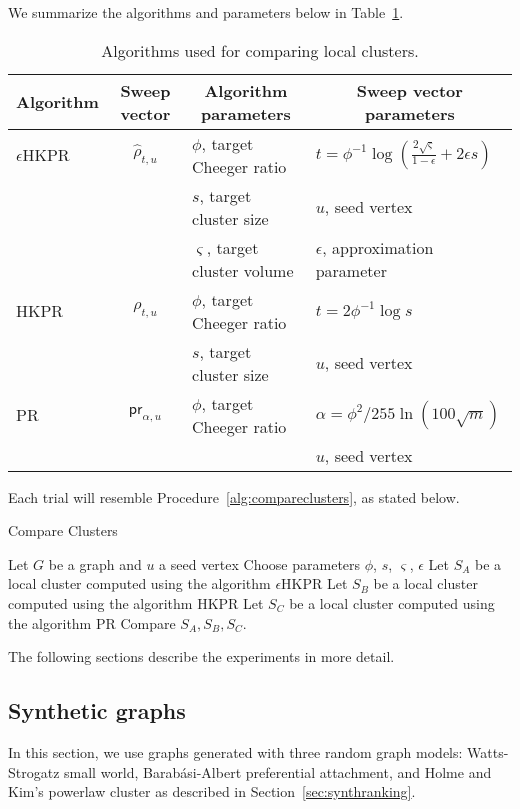 \documentclass[runningheads,a4paper]{llncs}
\newcommand{\pr}{\textsf{pr}}
\newcommand{\tparamcluster}{\phi^{-1}\log(\frac{2\sqrt{\varsigma}}{1-\epsilon} + 2\epsilon s)}
\begin{document}
We summarize the algorithms and parameters below in
Table~\ref{table:clusteralgs}.

\begin{table}
\centering
\begin{tabular}{|l|c|l|l|}
\hline
\multicolumn{1}{|c|}{Algorithm} & Sweep vector &
\multicolumn{1}{|c|}{Algorithm parameters} & \multicolumn{1}{|c|}{Sweep vector
parameters}\\
\hline\hline
$\epsilon$HKPR & $\hat{\rho}_{t,u}$ & $\phi$, target Cheeger ratio & $t = \tparamcluster$\\
& & $s$, target cluster size & $u$, seed vertex\\
& & $\varsigma$, target cluster volume & $\epsilon$, approximation parameter\\\hline
HKPR & $\rho_{t,u}$ & $\phi$, target Cheeger ratio & $t = 2\phi^{-1}\log s$\\
& & $s$, target cluster size & $u$, seed vertex\\\hline
PR & $\pr_{\alpha,u}$ & $\phi$, target Cheeger ratio & $\alpha = \phi^2/255\ln(100\sqrt{m})$\\
& & & $u$, seed vertex\\\hline
\end{tabular}
\caption{Algorithms used for comparing local clusters.}
\label{table:clusteralgs}
\end{table}

Each trial will resemble Procedure~\ref{alg:compareclusters}, as stated below.

\begin{algorithm}[H]
\caption{Compare Clusters}
\label{alg:compareclusters}
\begin{algorithmic}
\State Let $G$ be a graph and $u$ a seed vertex
\State Choose parameters $\phi$, $s$, $\varsigma$, $\epsilon$
\State Let $S_A$ be a local cluster computed using the algorithm $\epsilon$HKPR
\State Let $S_B$ be a local cluster computed using the algorithm HKPR
\State Let $S_C$ be a local cluster computed using the algorithm PR
\State Compare $S_A, S_B, S_C$.
\end{algorithmic}
\end{algorithm}

The following sections describe the experiments in more detail.

\subsection{Synthetic graphs}
In this section, we use graphs generated with three random graph models:
Watts-Strogatz small world, Barab\'{a}si-Albert preferential attachment, and
Holme and Kim's powerlaw cluster as described in Section~\ref{sec:synthranking}.
\end{document}
